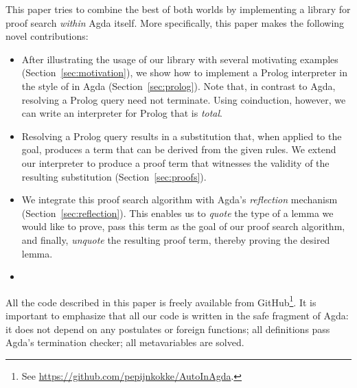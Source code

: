 \documentclass[preprint]{sigplanconf}
\begin{document}
This paper tries to combine the best of both worlds by implementing
a library for proof search \emph{within} Agda itself. More specifically,
this paper makes the following novel contributions:

\begin{itemize}
\item %
  After illustrating the usage of our library with several motivating
  examples (Section~\ref{sec:motivation}), we show how to implement a
  Prolog interpreter in the style of \citet{stutterheim} in Agda
  (Section~\ref{sec:prolog}). Note that, in contrast to Agda,
  resolving a Prolog query need not terminate. Using coinduction,
  however, we can write an interpreter for Prolog that is \emph{total}.
\item %
  Resolving a Prolog query results in a substitution that, when applied
  to the goal, produces a term that can be derived from the given
  rules. We extend our interpreter to produce a proof term that
  witnesses the validity of the resulting substitution
  (Section~\ref{sec:proofs}).
\item %
  We integrate this proof search algorithm with Agda's
  \emph{reflection} mechanism (Section~\ref{sec:reflection}). This
  enables us to \emph{quote} the type of a lemma we would like to
  prove, pass this term as the goal of our proof search algorithm, and
  finally, \emph{unquote} the resulting proof term, thereby proving
  the desired lemma.
\item %
   
\end{itemize}

All the code described in this paper is freely available from
GitHub\footnote{
  See \url{https://github.com/pepijnkokke/AutoInAgda}.
}. It is important to emphasize that all our code
is written in the safe fragment of Agda: it does not depend on any
postulates or foreign functions; all definitions pass Agda's
termination checker; all metavariables are solved.
\end{document}
